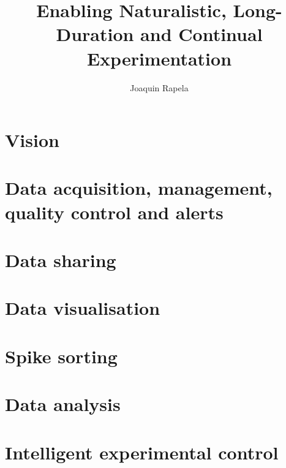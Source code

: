 \documentclass[12pt]{article}
\title{Enabling Naturalistic, Long-Duration and Continual Experimentation}
\author{Joaquin Rapela}
\begin{document}
\maketitle

\tableofcontents

\pagebreak

\section{Vision}



\pagebreak

\section{Data acquisition, management, quality control and alerts}


\pagebreak

\section{Data sharing}


\pagebreak

\section{Data visualisation}


\pagebreak

\section{Spike sorting}


\pagebreak

\section{Data analysis}


\pagebreak

\section{Intelligent experimental control}


\pagebreak



\end{document}
